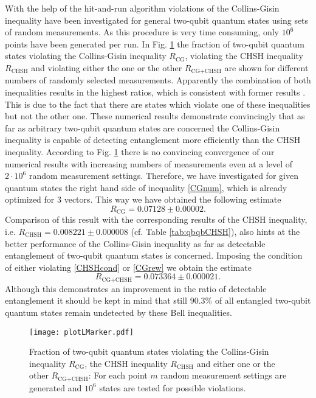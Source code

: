 \documentclass[12pt]{iopart}
\begin{document}
With the help of the hit-and-run algorithm violations of the Collins-Gisin inequality have been investigated
for general two-qubit quantum states using sets of random measurements.
As this procedure is very time consuming, only $10^6$ points have been generated per run. 
In Fig. \ref{fig:CGrandom} the fraction of two-qubit quantum states violating the Collins-Gisin inequality $R_{\text{CG}}$, violating the CHSH inequality $R_{\text{CHSH}}$ and violating either the one or the other $R_{\text{CG}+\text{CHSH}}$ are shown for different numbers of randomly selected measurements. Apparently the combination of both inequalities results in the highest ratios, which is consistent with former results \cite{CG}.
This is due to the fact that there are states which violate one of these inequalities but not the other one. These numerical results demonstrate convincingly that as far as arbitrary two-qubit quantum states are concerned the Collins-Gisin inequality is capable of detecting entanglement more efficiently than the CHSH inequality. According to Fig.  \ref{fig:CGrandom} there is no convincing convergence of our numerical results with increasing numbers of measurements even at a level of $2\cdot 10^6$ random measurement settings. Therefore,
we have investigated for given quantum states the right hand side of inequality \eqref{CGnum}, which is already optimized for $3$ vectors.
This way we have obtained the following estimate
\begin{equation} \label{CGest}
 R_{\text{CG}}=0.07128 \pm 0.00002.
\end{equation}
Comparison of this result with the corresponding results of the CHSH inequality, i.e. 
 $R_{\text{CHSH}}=0.008221\pm 0.000008$ (cf. Table \ref{tab:qbqbCHSH}), also hints at the better performance of the Collins-Gisin inequality as far as detectable entanglement of two-qubit quantum states is concerned. 
Imposing the condition of either violating
\eqref{CHSHcond} or \eqref{CGrew} we obtain the estimate
\begin{equation} \label{CG+CHSHest}
 R_{\text{CG}+\text{CHSH}}= 0.073364 \pm 0.000021.
\end{equation}
Although this demonstrates an improvement in the ratio of detectable entanglement it should be kept in mind that still $90.3 \%$ of all entangled two-qubit quantum states remain undetected by these Bell inequalities.


\begin{figure}[t!]
   \centering
   \texttt{[image: plotLMarker.pdf]}
     \caption{Fraction of two-qubit quantum states violating the Collins-Gisin inequality $R_{\text{CG}}$, the CHSH inequality $R_{\text{CHSH}}$ and either one or the other $R_{\text{CG}+\text{CHSH}}$: For each point $m$ random measurement settings are generated and $10^6$ states are tested for possible violations.}
   \label{fig:CGrandom}
 \end{figure}
\end{document}
